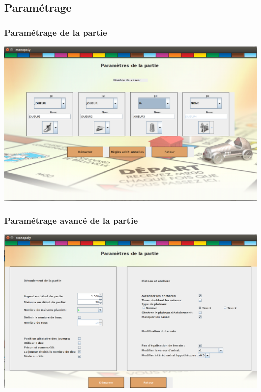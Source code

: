 \documentclass{beamer}
\begin{document}
\begin{darkframes}
    \subsection{Paramétrage} 	
     \begin{frame}
 	 \frametitle{Paramétrage de la partie}
 	 \begin{center}
 	 \includegraphics[scale=0.25]{./img/parametre1.png}
		
	\end{center}
    \end{frame}
    
    \begin{frame}
 	 \frametitle{Paramétrage avancé de la partie}
 	 \begin{center}
 	 \includegraphics[scale=0.25]{./img/parametre2.png}
		
	\end{center}
    \end{frame}
  

\end{darkframes}
\end{document}
